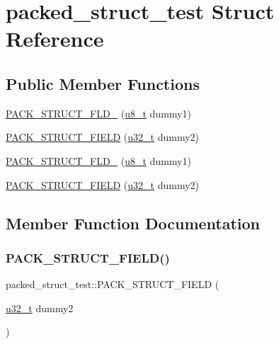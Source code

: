 \hypertarget{structpacked__struct__test}{}\section{packed\+\_\+struct\+\_\+test Struct Reference}
\label{structpacked__struct__test}
\subsection*{Public Member Functions}
\begin{DoxyCompactItemize}
\item 
\hyperlink{structpacked__struct__test_a3e24dcbac86147707ffe8afb7b2b1198}{P\+A\+C\+K\+\_\+\+S\+T\+R\+U\+C\+T\+\_\+\+F\+L\+D\+\_} (\hyperlink{group__compiler__abstraction_ga4caecabca98b43919dd11be1c0d4cd8e}{u8\+\_\+t} dummy1)
\item 
\hyperlink{structpacked__struct__test_a50b12c50fb386ded21c3306c3b2248c8}{P\+A\+C\+K\+\_\+\+S\+T\+R\+U\+C\+T\+\_\+\+F\+I\+E\+LD} (\hyperlink{group__compiler__abstraction_ga4c14294869aceba3ef9d4c0c302d0f33}{u32\+\_\+t} dummy2)
\item 
\hyperlink{structpacked__struct__test_a3e24dcbac86147707ffe8afb7b2b1198}{P\+A\+C\+K\+\_\+\+S\+T\+R\+U\+C\+T\+\_\+\+F\+L\+D\+\_} (\hyperlink{group__compiler__abstraction_ga4caecabca98b43919dd11be1c0d4cd8e}{u8\+\_\+t} dummy1)
\item 
\hyperlink{structpacked__struct__test_a50b12c50fb386ded21c3306c3b2248c8}{P\+A\+C\+K\+\_\+\+S\+T\+R\+U\+C\+T\+\_\+\+F\+I\+E\+LD} (\hyperlink{group__compiler__abstraction_ga4c14294869aceba3ef9d4c0c302d0f33}{u32\+\_\+t} dummy2)
\end{DoxyCompactItemize}


\subsection{Member Function Documentation}
\mbox{\label{structpacked__struct__test_a50b12c50fb386ded21c3306c3b2248c8}} 
\subsubsection{\texorpdfstring{P\+A\+C\+K\+\_\+\+S\+T\+R\+U\+C\+T\+\_\+\+F\+I\+E\+L\+D()}{PACK\_STRUCT\_FIELD()}\hspace{0.1cm}{\footnotesize\ttfamily [1/2]}}
{\footnotesize\ttfamily packed\+\_\+struct\+\_\+test\+::\+P\+A\+C\+K\+\_\+\+S\+T\+R\+U\+C\+T\+\_\+\+F\+I\+E\+LD (\begin{DoxyParamCaption}\item[{\hyperlink{group__compiler__abstraction_ga4c14294869aceba3ef9d4c0c302d0f33}{u32\+\_\+t}}]{dummy2 }\end{DoxyParamCaption})}

